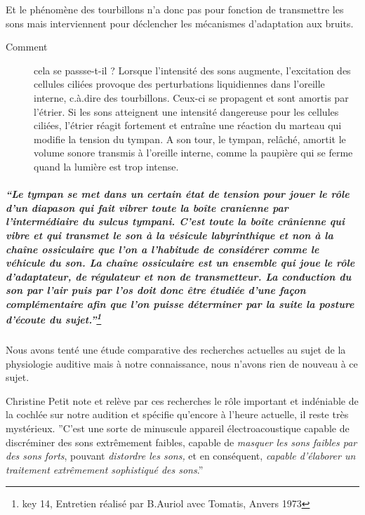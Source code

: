 Et le phénomène des tourbillons n'a donc pas pour fonction de transmettre
les sons mais interviennent pour déclencher les mécanismes d'adaptation
aux bruits. 
\begin{description}
\item [{Comment}] cela se passse-t-il ? Lorsque l'intensité des sons augmente,
l'excitation des cellules ciliées provoque des perturbations liquidiennes
dans l'oreille interne, c.à.dire des tourbillons. Ceux-ci se propagent
et sont amortis par l'étrier. Si les sons atteignent une intensité
dangereuse pour les cellules ciliées, l'étrier réagit fortement et
entraîne une réaction du marteau qui modifie la tension du tympan.
A son tour, le tympan, relâché, amortit le volume sonore transmis
à l'oreille interne, comme la paupière qui se ferme quand la lumière
est trop intense.
\end{description}

\subparagraph*{``Le tympan se met dans un certain état de tension pour jouer le
rôle d\textquoteright un diapason qui fait vibrer toute la boîte cranienne
par l'intermédiaire du sulcus tympani. \emph{C'est toute la boîte
crânienne qui vibre et qui transmet le son à la vésicule labyrinthique
et non à la chaîne ossiculaire que l'on a l'habitude de considérer
comme le véhicule du son. }La chaîne ossiculaire est un ensemble qui
joue le rôle d'adaptateur, de régulateur et non de transmetteur. La
conduction du son par l\textquoteright air puis par l'os doit donc
être étudiée d\textquoteright une façon complémentaire afin que l'on
puisse déterminer par la suite la posture d'écoute du sujet.''\protect\footnote{key 14, Entretien réalisé par B.Auriol avec Tomatis, Anvers 1973}}

Nous avons tenté  une étude comparative des
recherches actuelles au sujet de la physiologie auditive mais à notre connaissance, nous n'avons rien de nouveau à ce sujet.

Christine Petit note et relève par ces recherches le rôle important
et indéniable de la cochlée sur notre audition et spécifie qu'encore
à l'heure actuelle, il reste très mystérieux. 
''C'est une sorte de minuscule appareil électroacoustique capable
de discréminer des sons extrêmement faibles, capable de \emph{masquer
les sons faibles par des sons forts}, pouvant \emph{distordre les
sons,} et en conséquent, \emph{capable d'élaborer un traitement extrêmement
sophistiqué des sons}.''

